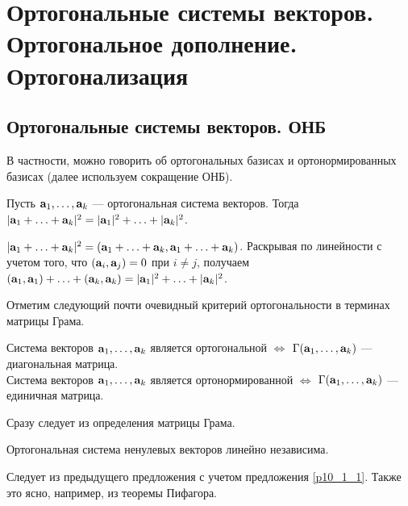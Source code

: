 \section{Ортогональные системы векторов. Ортогональное дополнение. Ортогонализация} %


\subsection{Ортогональные системы векторов. ОНБ}



В частности, можно говорить об ортогональных базисах и ортонормированных базисах (далее используем сокращение ОНБ).

\begin{predl}\label{p10_2_1}
Пусть $\mathbf{a}_1, \ldots, \mathbf{a}_k$ --- ортогональная система векторов. Тогда 
$|\mathbf{a}_1 + \ldots + \mathbf{a}_k|^2=|\mathbf{a}_1|^2+\ldots + |\mathbf{a}_k|^2$.
\end{predl}
\dok
$|\mathbf{a}_1 + \ldots + \mathbf{a}_k|^2=(\mathbf{a}_1 + \ldots + \mathbf{a}_k, \mathbf{a}_1 + \ldots + \mathbf{a}_k)$.
Раскрывая по линейности с учетом того, что $(\mathbf{a}_i, \mathbf{a}_j)=0$ при $i\neq j$, 
получаем $(\mathbf{a}_1, \mathbf{a}_1)+\ldots + (\mathbf{a}_k, \mathbf{a}_k) = |\mathbf{a}_1|^2+\ldots + |\mathbf{a}_k|^2$.
\edok

\otstup

Отметим следующий почти очевидный критерий ортогональности в терминах матрицы Грама.

\begin{predl}\label{p10_2_2} 
Система векторов $\mathbf{a}_1, \ldots, \mathbf{a}_k$ является ортогональной $\Leftrightarrow$ $\Gamma(\mathbf{a}_1, \ldots, \mathbf{a}_k)$ --- диагональная матрица. \\
Система векторов $\mathbf{a}_1, \ldots, \mathbf{a}_k$ является ортонормированной $\Leftrightarrow$ $\Gamma(\mathbf{a}_1, \ldots, \mathbf{a}_k)$ --- единичная матрица. 
\end{predl}
\dok Сразу следует из определения матрицы Грама.
\edok

\begin{sled1}
Ортогональная система ненулевых векторов линейно независима.
\end{sled1}
\dok Следует из предыдущего предложения с учетом предложения \ref{p10_1_1}.
{\footnotesize Также это ясно, например, из теоремы Пифагора.}
\edok

